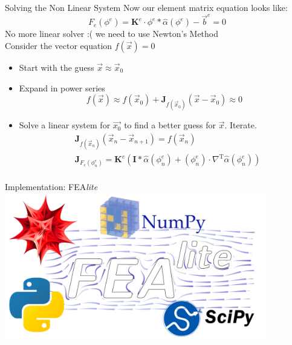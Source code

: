 \documentclass{beamer}
\begin{document}
    \begin{frame}{Solving the Non Linear System}
        Now our element matrix equation looks like:
        \[F_e(\phi^{e})=\mathbf{K}^e\cdot \phi^e*\hat{\alpha}(\phi^{e})-\vec{b}^e=0\]
        No more linear solver :( we need to use Newton's Method\\
        \smallbreak
        Consider the vector equation $f(\vec{x})=0$
        \begin{itemize}
            \item Start with the guess $\vec{x}\approx\vec{x}_0$
            \item Expand in power series
            \[f(\vec{x})\approx f(\vec{x}_0)+\mathbf{J}_{f(\vec{x}_0)}(\vec{x}-\vec{x}_0)\approx 0\]
            \item Solve a linear system for $\vec{x_0}$ to find a better guess for $\vec{x}$.
            Iterate.
            \begin{align*}
                &\mathbf{J}_{f(\vec{x}_n)}\left(\vec{x}_{n}-\vec{x}_{n+1}\right)=f(\vec{x}_{n})\\
                &\mathbf{J}_{F_e(\phi_n^e)}=\mathbf{K}^e\left( \mathbf{I}*\hat{\alpha}(\phi_n^e)+\left(\phi_n^e\right)\cdot \nabla^{\text{T}}\hat{\alpha}(\phi_n^e) \right)\\
            \end{align*}
        \end{itemize}
    \end{frame}
    \begin{frame}{Implementation: FEA\textit{lite}}
        \hspace{-0.72cm}
        \includegraphics[width=4.5in]{technology.pdf}

    \end{frame}
\end{document}
